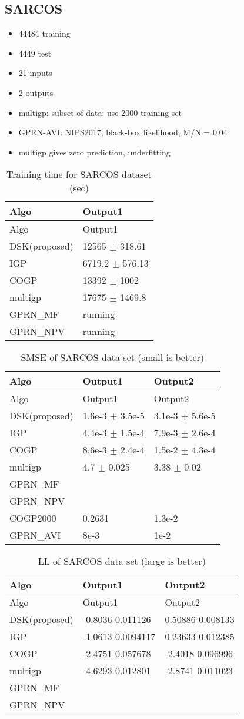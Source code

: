 \subsection{SARCOS}\label{sarcos}

\begin{itemize}
\item
  44484 training
\item
  4449 test
\item
  21 inputs
\item
  2 outputs
\item
  multigp: subset of data: use 2000 training set
\item
  GPRN-AVI: NIPS2017, black-box likelihood, M/N = 0.04
\item
  multigp gives zero prediction, underfitting
\end{itemize}

\begin{longtable}[]{@{}ll@{}}
\caption{Training time for SARCOS dataset (sec)}\tabularnewline
\toprule
Algo & Output1\tabularnewline
\midrule
\endfirsthead
\toprule
Algo & Output1\tabularnewline
\midrule
\endhead
DSK(proposed) & 12565 \(\pm\) 318.61\tabularnewline
IGP & 6719.2 \(\pm\) 576.13\tabularnewline
COGP & 13392 \(\pm\) 1002\tabularnewline
multigp & 17675 \(\pm\) 1469.8\tabularnewline
GPRN\_MF & running\tabularnewline
GPRN\_NPV & running\tabularnewline
\bottomrule
\end{longtable}

\begin{longtable}[]{@{}lll@{}}
\caption{SMSE of SARCOS data set (small is better)}\tabularnewline
\toprule
Algo & Output1 & Output2\tabularnewline
\midrule
\endfirsthead
\toprule
Algo & Output1 & Output2\tabularnewline
\midrule
\endhead
DSK(proposed) & 1.6e-3 \(\pm\) 3.5e-5 & 3.1e-3 \(\pm\)
5.6e-5\tabularnewline
IGP & 4.4e-3 \(\pm\) 1.5e-4 & 7.9e-3 \(\pm\) 2.6e-4\tabularnewline
COGP & 8.6e-3 \(\pm\) 2.4e-4 & 1.5e-2 \(\pm\) 4.3e-4\tabularnewline
multigp & 4.7 \(\pm\) 0.025 & 3.38 \(\pm\) 0.02\tabularnewline
GPRN\_MF & &\tabularnewline
GPRN\_NPV & &\tabularnewline
COGP2000 & 0.2631 & 1.3e-2\tabularnewline
GPRN\_AVI & 8e-3 & 1e-2\tabularnewline
\bottomrule
\end{longtable}

\begin{longtable}[]{@{}lll@{}}
\caption{LL of SARCOS data set (large is better)}\tabularnewline
\toprule
Algo & Output1 & Output2\tabularnewline
\midrule
\endfirsthead
\toprule
Algo & Output1 & Output2\tabularnewline
\midrule
\endhead
DSK(proposed) & -0.8036 0.011126 & 0.50886 0.008133\tabularnewline
IGP & -1.0613 0.0094117 & 0.23633 0.012385\tabularnewline
COGP & -2.4751 0.057678 & -2.4018 0.096996\tabularnewline
multigp & -4.6293 0.012801 & -2.8741 0.011023\tabularnewline
GPRN\_MF &\tabularnewline
GPRN\_NPV &\tabularnewline
\bottomrule
\end{longtable}

